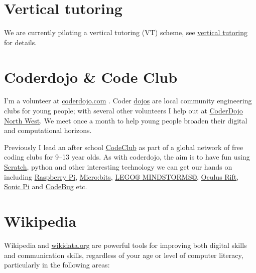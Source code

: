 \documentclass[
  12pt,
]{book}
\begin{document}
\hypertarget{vt}{%
\section{Vertical tutoring}\label{vt}}

We are currently piloting a vertical tutoring (VT) scheme, see \href{http://www.cs.man.ac.uk/~hulld/vertical-tutoring.html}{vertical tutoring} for details. \citep{vtbernard, druryvert}

\hypertarget{codeclub}{%
\section{Coderdojo \& Code Club}\label{codeclub}}

I'm a volunteer at \href{https://coderdojo.com/}{coderdojo.com} \citep{coderdojo}. Coder \href{https://en.wikipedia.org/wiki/Dojo}{dojos} are local community engineering clubs for young people; with several other volunteers I help out at \href{https://twitter.com/coderdojonw}{CoderDojo North West}. We meet once a month to help young people broaden their digital and computational horizons.

Previously I lead an after school \href{https://codeclub.org}{CodeClub} as part of a global network of free coding clubs for 9--13 year olds. \citep{codeclub} As with coderdojo, the aim is to have fun using \href{https://scratch.mit.edu/}{Scratch}, \citep{Resnick2009} python and other interesting technology we can get our hands on including \href{https://www.raspberrypi.org/}{Raspberry Pi}, \citep{raspberrypi} \href{https://microbit.org/}{Micro:bits}, \citep{Sentance2017} \href{https://www.lego.com/en-gb/themes/mindstorms}{LEGO® MINDSTORMS®}, \citep{Papert1980, Klassner2003} \href{https://www.oculus.com}{Oculus Rift}, \href{https://sonic-pi.net/}{Sonic Pi} \citep{Aaron2016} and \href{http://www.codebug.org.uk/}{CodeBug} etc.

\hypertarget{wikipedia}{%
\section{Wikipedia}\label{wikipedia}}

Wikipedia and \href{https://www.wikidata.org}{wikidata.org} \citep{Vrandecic2014, Turki2019} are powerful tools for improving both digital skills and communication skills, regardless of your age or level of computer literacy, \citep{Proffitt2018, goodfaith, Littlejohn2019} particularly in the following areas:
\end{document}
